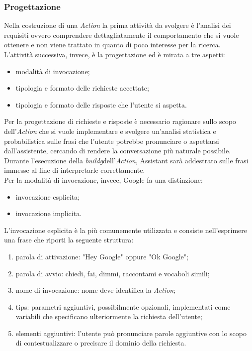 		\subsubsection{Progettazione}
		Nella costruzione di una \emph{Action} la prima attività da svolgere è l'analisi dei requisiti ovvero comprendere dettagliatamente il comportamento che si vuole ottenere e non viene trattato in quanto di poco interesse per la ricerca. \\
		L'attività successiva, invece, è la progettazione ed è mirata a tre aspetti:
		\begin{itemize}
			\item modalità di invocazione;
			\item tipologia e formato delle richieste accettate;
			\item tipologia e formato delle risposte che l'utente si aspetta.
		\end{itemize}
		Per la progettazione di richieste e risposte è necessario ragionare sullo scopo dell'\emph{Action} che si vuole implementare e svolgere un'analisi statistica e probabilistica sulle frasi che l'utente potrebbe pronunciare o aspettarsi dall'assistente, cercando di rendere la conversazione più naturale possibile. Durante l'esecuzione della \emph{\gls{buildg}}\glsfirstoccur dell'\emph{Action}, Assistant sarà addestrato sulle frasi immesse al fine di interpretarle correttamente. \\
		Per la modalità di invocazione, invece, Google fa una distinzione:
		\begin{itemize}
			\item invocazione esplicita;
			\item invocazione implicita.
		\end{itemize}
		L'invocazione esplicita è la più comunemente utilizzata e consiste nell'esprimere una frase che riporti la seguente struttura:
		\begin{enumerate}
			\item parola di attivazione: "Hey Google" oppure "Ok Google";
			\item parola di avvio: chiedi, fai, dimmi, raccontami e vocaboli simili;
			\item nome di invocazione: nome deve identifica la \emph{Action};
			\item tips: parametri aggiuntivi, possibilmente opzionali, implementati come variabili che specificano ulteriormente la richiesta dell'utente;
			\item elementi aggiuntivi: l'utente può pronunciare parole aggiuntive con lo scopo di contestualizzare o precisare il dominio della richiesta.
		\end{enumerate}
